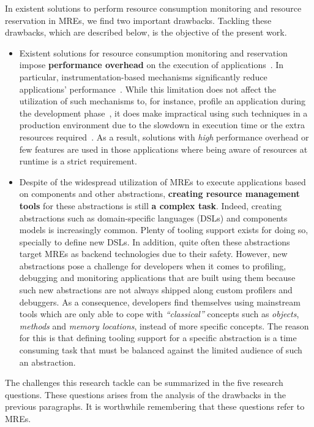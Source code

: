 In existent solutions to perform resource consumption monitoring and resource reservation in MREs, we find two important drawbacks.
Tackling these drawbacks, which are described below, is the objective of the present work.

\begin{itemize}
\item Existent solutions for resource consumption monitoring and reservation impose \textbf{performance overhead} on the execution of applications~\cite{}.
In particular, instrumentation-based mechanisms significantly reduce applications' performance~\cite{}.
While this limitation does not affect the utilization of such mechanisms to, for instance, profile an application during the development phase~\cite{}, it does make impractical using such techniques in a production environment due to the slowdown in execution time or the extra resources required~\cite{}.
As a result, solutions with \textit{high} performance overhead or few features are used in those applications where being aware of resources at runtime is a strict requirement.

\item Despite of the widespread utilization of MREs to execute applications based on components and other abstractions, \textbf{creating resource management tools} for these abstractions is still \textbf{a complex task}.
Indeed, creating abstractions such as domain-specific languages (DSLs) and components models is increasingly common.
Plenty of tooling support exists for doing so, specially to define new DSLs.
In addition, quite often these abstractions target MREs as backend technologies due to their safety.
However, new abstractions pose a challenge for developers when it comes to profiling, debugging and monitoring applications that are built using them because such new abstractions are not always shipped along custom profilers and debuggers.
As a consequence, developers find themselves using mainstream tools which are only able to cope with \textit{``classical''} concepts such as \textit{objects}, \textit{methods} and \textit{memory locations}, instead of more specific concepts.
The reason for this is that defining tooling support for a specific abstraction is a time consuming task that must be balanced against the limited audience of such an abstraction.
\end{itemize}
 
The challenges this research tackle can be summarized in the five research questions.
These questions arises from the analysis of the drawbacks in the previous paragraphs.
It is worthwhile remembering that these questions refer to MREs.

